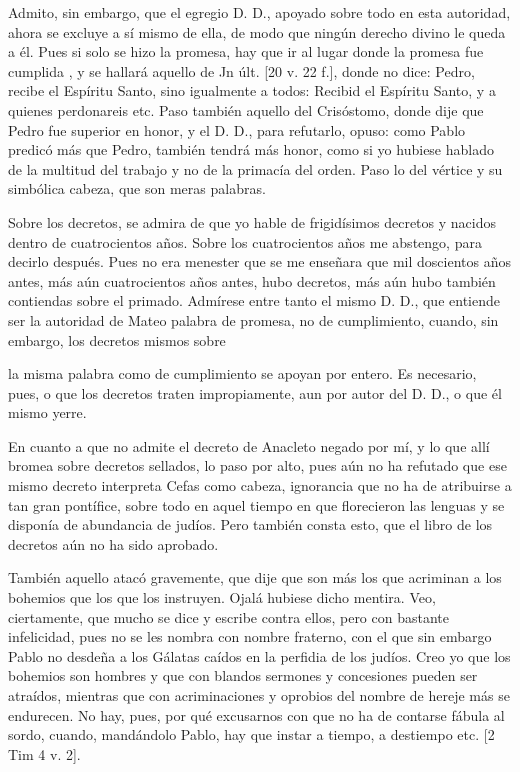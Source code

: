 Admito, sin embargo, que el egregio D. D., apoyado sobre todo en esta autoridad, ahora se excluye a sí mismo de ella, de modo que ningún derecho divino le queda a él. Pues si solo se hizo la promesa, hay que ir al lugar donde la promesa fue cumplida \marginpar{\small[287]}, y se hallará aquello de Jn últ. [20 v. 22 f.], donde no dice: Pedro, recibe el Espíritu Santo, sino igualmente a todos: Recibid el Espíritu Santo, y a quienes perdonareis etc. Paso también aquello del Crisóstomo, donde dije que Pedro fue superior en honor, y el D. D., para refutarlo, opuso: como Pablo predicó más que Pedro, también tendrá más honor, como si yo hubiese hablado de la multitud del trabajo y no de la primacía del orden. Paso lo del vértice y su simbólica cabeza, que son meras palabras.

Sobre los decretos, se admira de que yo hable de frigidísimos decretos y nacidos dentro de cuatrocientos años. Sobre los cuatrocientos años me abstengo, para decirlo después. Pues no era menester que se me enseñara que mil doscientos años antes, más aún cuatrocientos años antes, hubo decretos, más aún hubo también contiendas sobre el primado. Admírese entre tanto el mismo D. D., que entiende ser la autoridad de Mateo palabra de promesa, no de cumplimiento, cuando, sin embargo, los decretos mismos sobre

la misma palabra como de cumplimiento se apoyan por entero. Es necesario, pues, o que los decretos traten impropiamente, aun por autor del D. D., o que él mismo yerre.

En cuanto a que no admite el decreto de Anacleto negado por mí, y lo que allí bromea sobre decretos sellados, lo paso por alto, pues aún no ha refutado que ese mismo decreto interpreta Cefas como cabeza, ignorancia que no ha de atribuirse a tan gran pontífice, sobre todo en aquel tiempo en que florecieron las lenguas y se disponía de abundancia de judíos. Pero también consta esto, que el libro de los decretos aún no ha sido aprobado.

También aquello atacó gravemente, que dije que son más los que acriminan a los bohemios que los que los instruyen. Ojalá hubiese dicho mentira. Veo, ciertamente, que mucho se dice y escribe contra ellos, pero con bastante infelicidad, pues no se les nombra con nombre fraterno, con el que sin embargo Pablo no desdeña a los Gálatas caídos en la perfidia de los judíos. Creo yo que los bohemios son hombres y que con blandos sermones y concesiones pueden ser atraídos, mientras que con acriminaciones y oprobios del nombre de hereje más se endurecen. No hay, pues, por qué excusarnos con que no ha de contarse fábula al sordo, cuando, mandándolo Pablo, hay que instar a tiempo, a destiempo etc. [2 Tim 4 v. 2].

